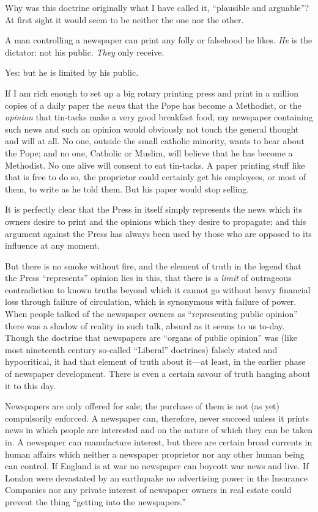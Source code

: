 \documentclass{book}
\begin{document}
Why was this doctrine originally what I have called it, “plausible and arguable”? At first sight it would seem to be neither the one nor the other.

A man controlling a newspaper can print any folly or falsehood he likes. \emph{He} is the dictator: not his public. \emph{They} only receive.

Yes: but he is limited by his public.

If I am rich enough to set up a big rotary printing press and print in a million copies of a daily paper the \emph{news} that the Pope has become a Methodist, or the \emph{opinion} that tin-tacks make a very good breakfast food, my newspaper containing such news and such an opinion would obviously not touch the general thought and will at all. No one, outside the small catholic minority, wants to hear about the Pope; and no one, Catholic or Muslim, will believe that he has become a Methodist. No one alive will consent to eat tin-tacks. A paper printing stuff like that is free to do so, the proprietor could certainly get his employees, or most of them, to write as he told them. But his paper would stop selling.

It is perfectly clear that the Press in itself simply represents the news which its owners desire to print and the opinions which they desire to propagate; and this argument against the Press has always been used by those who are opposed to its influence at any moment.

But there is no smoke without fire, and the element of truth in the legend that the Press “represents” opinion lies in this, that there is a \emph{limit} of outrageous contradiction to known truths beyond which it cannot go without heavy financial loss through failure of circulation, which is synonymous with failure of power. When people talked of the newspaper owners as “representing public opinion” there was a shadow of reality in such talk, absurd as it seems to us to-day. Though the doctrine that newspapers are “organs of public opinion” was (like most nineteenth century so-called “Liberal” doctrines) falsely stated and hypocritical, it had that element of truth about it—at least, in the earlier phase of newspaper development. There is even a certain savour of truth hanging about it to this day.

Newspapers are only offered for sale; the purchase of them is not (as yet) compulsorily enforced. A newspaper can, therefore, never succeed unless it prints news in which people are interested and on the nature of which they can be taken in. A newspaper can manufacture interest, but there are certain broad currents in human affairs which neither a newspaper proprietor nor any other human being can control. If England is at war no newspaper can boycott war news and live. If London were devastated by an earthquake no advertising power in the Insurance Companies nor any private interest of newspaper owners in real estate could prevent the thing “getting into the newspapers.”
\end{document}
